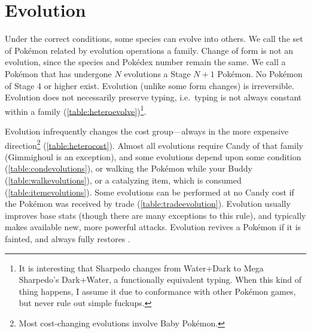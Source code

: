 \section{Evolution\label{sec:evolution}}
Under the correct conditions, some species can evolve into others.
We call the set of Pokémon related by evolution operations a family.
Change of form is not an evolution, since the species and Pokédex number remain the same.
We call a Pokémon that has undergone $N$ evolutions a Stage $N+1$ Pokémon.
No Pokémon of Stage 4 or higher exist.
Evolution (unlike some form changes) is irreversible.
Evolution does not necessarily preserve typing, i.e.\ typing is not always constant within a family (\autoref{table:heteroevolve})\footnote{It is interesting
  that Sharpedo changes from Water+Dark to Mega Sharpedo's Dark+Water,
  a functionally equivalent typing. When this kind of thing happens,
  I assume it due to conformance with other Pokémon games, but never
  rule out simple fuckups.}.

Evolution infrequently changes the cost group---always in the more expensive direction\footnote{Most
  cost-changing evolutions involve Baby Pokémon.} (\autoref{table:heterocost}).
Almost all evolutions require Candy of that family (Gimmighoul is an exception),
  and some evolutions depend upon some condition (\autoref{table:condevolutions}),
  or walking the Pokémon while your Buddy (\autoref{table:walkevolutions}),
  or a catalyzing item, which is consumed (\autoref{table:itemevolutions}).
Some evolutions can be performed at no Candy cost if the Pokémon was received by trade
 (\autoref{table:tradeevolution}).
Evolution usually improves base stats (though there are many exceptions to this rule),
  and typically makes available new, more powerful attacks.
Evolution revives a Pokémon if it is fainted, and always fully restores \HP\@.


